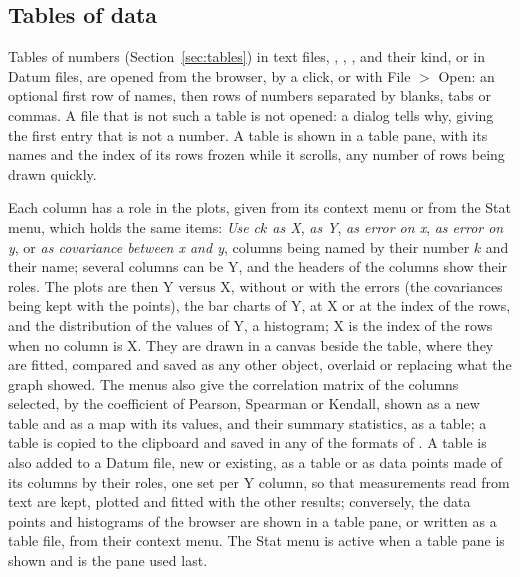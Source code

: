 \subsection{Tables of data}
\label{sec:guitables}

Tables of numbers (Section~\ref{sec:tables}) in text files, , , ,  and
their kind, or in Datum files, are opened from the browser, by a click, or with File $>$ Open: an optional first row
of names, then rows of numbers separated by blanks, tabs or commas. A file that is not such a table is not opened: a
dialog tells why, giving the first entry that is not a number. A table is shown in a table pane, with its names and
the index of its rows frozen while it scrolls, any number of rows being drawn quickly.

Each column has a role in the plots, given from its context menu or from the Stat menu, which holds the same
items: \emph{Use c$k$ as X}, \emph{as Y}, \emph{as error on x}, \emph{as error on y}, or \emph{as covariance between
x and y}, columns being named by their number $k$ and their name; several columns can be Y, and the headers of the
columns show their roles. The plots are then Y versus X, without or with the errors (the covariances being kept with
the points), the bar charts of Y, at X or at the index of the rows, and the distribution of the values of Y, a
histogram; X is the index of the rows when no column is X. They are drawn in a canvas beside the table, where they
are fitted, compared and saved as any other object, overlaid or replacing what the graph showed. The menus also give
the correlation matrix of the columns selected, by the coefficient of Pearson, Spearman or Kendall, shown as a new
table and as a map with its values, and their summary statistics, as a table; a table is copied to the clipboard and
saved in any of the formats of . A table is also added to a Datum file, new or existing, as a table
or as data points made of its columns by their roles, one set per Y column, so that measurements read from text are
kept, plotted and fitted with the other results; conversely, the data points and histograms of the browser are shown
in a table pane, or written as a table file, from their context menu. The Stat menu is active when a table pane is shown and is the pane
used last.

